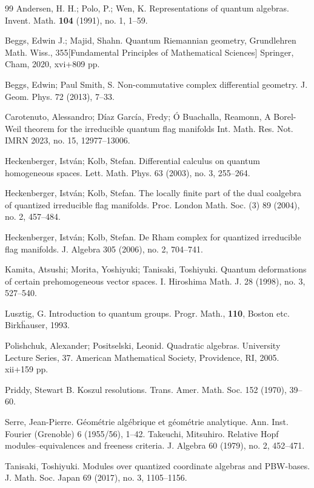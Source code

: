 \documentclass[a4paper, 12pt, leqno]{amsart}
\theoremstyle{definition}
\numberwithin{equation}{section}
\begin{document}

\begin{thebibliography}{99}
%
Andersen, H. H.;
Polo, P.;
Wen, K.
Representations of quantum algebras. 
Invent. Math. {\textbf{104}} (1991), no. 1, 1--59.

Beggs, Edwin J.; Majid, Shahn.
Quantum Riemannian geometry,
Grundlehren Math. Wiss., 355[Fundamental Principles of Mathematical Sciences]
Springer, Cham, 2020, xvi+809 pp.

Beggs, Edwin; Paul Smith, S. Non-commutative complex differential geometry. J. Geom. Phys. 72 (2013), 7--33. 

Carotenuto, Alessandro; D\'{i}az Garc\'{i}a, Fredy; \'{O} Buachalla, Reamonn,
A Borel-Weil theorem for the irreducible quantum flag manifolds
Int. Math. Res. Not. IMRN 2023, no. 15, 12977--13006. 

Heckenberger, Istv\'{a}n; Kolb, Stefan. 
Differential calculus on quantum homogeneous spaces. Lett. Math. Phys. 63 (2003), no. 3, 255--264.

Heckenberger, Istv\'{a}n; Kolb, Stefan. 
The locally finite part of the dual coalgebra of quantized irreducible flag manifolds. 
Proc. London Math. Soc. (3) 89 (2004), no. 2, 457--484. 

Heckenberger, Istv\'{a}n; Kolb, Stefan. De Rham complex for quantized irreducible flag manifolds. J. Algebra 305 (2006), no. 2, 704--741.

Kamita, Atsushi; Morita, Yoshiyuki; Tanisaki, Toshiyuki. 
Quantum deformations of certain prehomogeneous vector spaces. I. Hiroshima Math. J. 28 (1998), no. 3, 527--540.  

Lusztig, G.
Introduction to quantum groups. 
Progr. Math., \textbf{110}, Boston etc. Birk\"hauser, 1993.



Polishchuk, Alexander; Positselski, Leonid. 
Quadratic algebras. University Lecture Series, 37. American Mathematical Society, Providence, RI, 2005. xii+159 pp.

Priddy, Stewart B. 
Koszul resolutions. Trans. Amer. Math. Soc. 152 (1970), 39--60.



Serre, Jean-Pierre.
G\'{e}ométrie alg\'{e}brique et g\'{e}ométrie analytique.
Ann. Inst. Fourier (Grenoble) 6 (1955/56), 1--42.
Takeuchi, Mitsuhiro. 
Relative Hopf modules--equivalences and freeness criteria. 
J. Algebra 60 (1979), no. 2, 452--471.  

Tanisaki, Toshiyuki. Modules over quantized coordinate algebras and PBW-bases. J. Math. Soc. Japan 69 (2017), no. 3, 1105--1156. 



\end{thebibliography}
\end{document}
